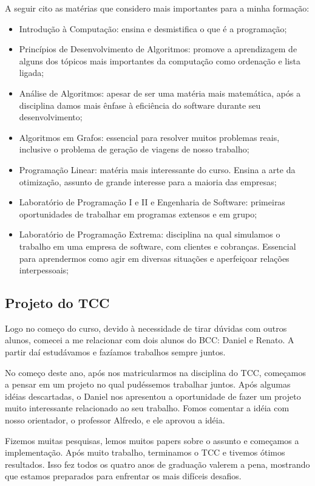 A seguir cito as matérias que considero mais importantes para a minha formação:

\begin{itemize} 
	\item Introdução à Computação: ensina e desmistifica o que é a programação;
	\item Princípios de Desenvolvimento de Algoritmos: promove a aprendizagem de alguns dos tópicos
mais importantes da computação como ordenação e lista ligada; 
	\item Análise de Algoritmos: apesar de ser uma matéria mais matemática, após a disciplina damos mais ênfase à eficiência do software durante seu desenvolvimento;
	\item Algoritmos em Grafos: essencial para resolver muitos problemas reais, inclusive o problema        de geração de viagens de nosso trabalho;
	\item Programação Linear: matéria mais interessante do curso. Ensina a arte da otimização, assunto de grande interesse para a maioria das empresas;
	\item Laboratório de Programação I e II e Engenharia de Software: primeiras oportunidades de trabalhar em programas extensos e em grupo; 
	\item Laboratório de Programação Extrema: disciplina na qual simulamos o trabalho em uma empresa
de software, com clientes e cobranças. Essencial para aprendermos como agir em diversas situações e
aperfeiçoar relações interpessoais;
\end{itemize}

\subsection{Projeto do TCC}

Logo no começo do curso, devido à necessidade de tirar dúvidas com outros alunos, comecei a me
relacionar com dois alunos do BCC: Daniel e Renato. A partir daí estudávamos e fazíamos trabalhos
sempre juntos.

No começo deste ano, após nos matricularmos na disciplina do TCC, começamos a pensar em um projeto
no qual pudéssemos trabalhar juntos. Após algumas idéias descartadas, o Daniel nos apresentou a
oportunidade de fazer um projeto muito interessante relacionado ao seu trabalho. Fomos
comentar a idéia com nosso orientador, o professor Alfredo, e ele aprovou a idéia.

Fizemos muitas pesquisas, lemos muitos papers sobre o assunto e começamos a implementação. Após
muito trabalho, terminamos o TCC e tivemos ótimos resultados. Isso fez todos os quatro anos de
graduação valerem a pena, mostrando que estamos preparados para enfrentar os mais difíceis desafios.

